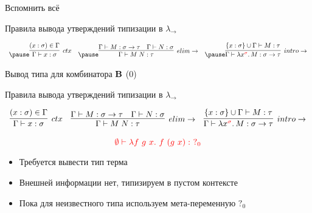 \begin{frame}{Вспомнить всё}
        \pause
        \begin{block}{Правила вывода утверждений типизации в $\lambda_{\rightarrow}$}
            \pause
            \vspace{-1em}
            \begin{center}
                \[
                    \begin{array}{l c r}
                        \pause \infer[ctx]{\Gamma \vdash x: \sigma}{(x: \sigma) \in \Gamma}
                        &
                        \pause \infer[elim\to]{\Gamma \vdash M\;N : \tau}{\Gamma \vdash M : \sigma \to \tau & \Gamma \vdash N : \sigma}
                        &
                        \pause \infer[intro\to]{\Gamma \vdash \lambda x^{\color{red} \sigma}\ldotp M : \sigma \to \tau}{\{x : \sigma\} \cup \Gamma \vdash M : \tau}
                    \end{array}
                \]
            \end{center}
        \end{block}
    \end{frame}


    \newcommand{\btypename}{Вывод типа для комбинатора $\term{B}$ }

    \begin{frame}[t]{\btypename (0)}
        \begin{block}{Правила вывода утверждений типизации в $\lambda_{\rightarrow}$}
            \vspace{-1em}
            \begin{center}
                \[
                    \begin{array}{l c r}
                        \infer[ctx]{\Gamma \vdash x: \sigma}{(x: \sigma) \in \Gamma}
                        &
                        \infer[elim\to]{\Gamma \vdash M\;N : \tau}{\Gamma \vdash M : \sigma \to \tau & \Gamma \vdash N : \sigma}
                        &
                        \infer[intro\to]{\Gamma \vdash \lambda x^{\color{red} \sigma}\ldotp M : \sigma \to \tau}{\{x : \sigma\} \cup \Gamma \vdash M : \tau}
                    \end{array}
                \]
            \end{center}
        \end{block}
        \[{\color{red}\emptyset \vdash \lambda f~g~x.~f~(g~x) :~ ?_0}\]
        \vspace{-1em}
        \begin{itemize}
            \item Требуется вывести тип терма
            \item Внешней информации нет, типизируем в пустом контексте
            \item Пока для неизвестного типа используем мета-переменную $?_0$
        \end{itemize}
    \end{frame}

